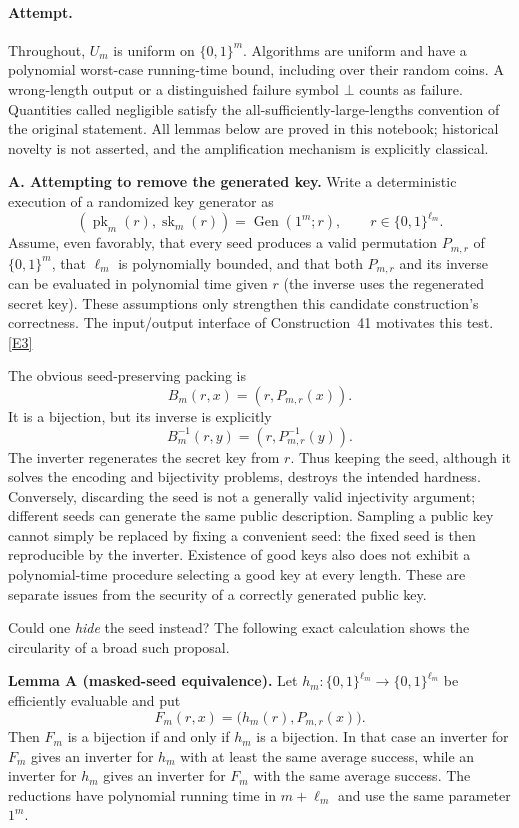 \documentclass[11pt,a4paper]{article}
\newcommand{\eref}[2]{\hyperlink{extra:#1:#2}{[E#2]}}
\numberwithin{equation}{section}
\begin{document}
\paragraph{Attempt.}
Throughout, $U_m$ is uniform on $\{0,1\}^m$. Algorithms are uniform and
have a polynomial worst-case running-time bound, including over their
random coins. A wrong-length output or a distinguished failure symbol
$\bot$ counts as failure. Quantities called negligible satisfy the
all-sufficiently-large-lengths convention of the original statement.
All lemmas below are proved in this notebook; historical novelty is not
asserted, and the amplification mechanism is explicitly classical.

\medskip{}
\textbf{A. Attempting to remove the generated key.}
Write a deterministic execution of a randomized key generator as
\[
 (\operatorname{pk}_m(r),\operatorname{sk}_m(r))
       =\operatorname{Gen}(1^m;r),\qquad r\in\{0,1\}^{\ell_m}.
\]
Assume, even favorably, that every seed produces a valid permutation
$P_{m,r}$ of $\{0,1\}^m$, that $\ell_m$ is polynomially bounded, and that
both $P_{m,r}$ and its inverse can be evaluated in polynomial time given
$r$ (the inverse uses the regenerated secret key). These assumptions
only strengthen this candidate construction's correctness.
The input/output interface of Construction~41 motivates this test.
\eref{statement}{3}

The obvious seed-preserving packing is
\begin{equation}\label{eq:statement:seed}
 B_m(r,x)=(r,P_{m,r}(x)).
\end{equation}
It is a bijection, but its inverse is explicitly
\[
 B_m^{-1}(r,y)=(r,P_{m,r}^{-1}(y)).
\]
The inverter regenerates the secret key from $r$. Thus keeping the seed,
although it solves the encoding and bijectivity problems, destroys the
intended hardness. Conversely, discarding the seed is not a generally
valid injectivity argument; different seeds can generate the same public
description. Sampling a public key cannot simply be replaced by fixing a
convenient seed: the fixed seed is then reproducible by the inverter.
Existence of good keys also does not exhibit a polynomial-time procedure
selecting a good key at every length. These are separate issues from the
security of a correctly generated public key.

Could one \emph{hide} the seed instead? The following exact calculation
shows the circularity of a broad such proposal.

\textbf{Lemma A (masked-seed equivalence).}
Let $h_m:\{0,1\}^{\ell_m}\to\{0,1\}^{\ell_m}$ be efficiently evaluable and put
\begin{equation}\label{eq:statement:masked}
 F_m(r,x)=\bigl(h_m(r),P_{m,r}(x)\bigr).
\end{equation}
Then $F_m$ is a bijection if and only if $h_m$ is a bijection. In that
case an inverter for $F_m$ gives an inverter for $h_m$ with at least the
same average success, while an inverter for $h_m$ gives an inverter for
$F_m$ with the same average success. The reductions have polynomial
running time in $m+\ell_m$ and use the same parameter $1^m$.
\end{document}
